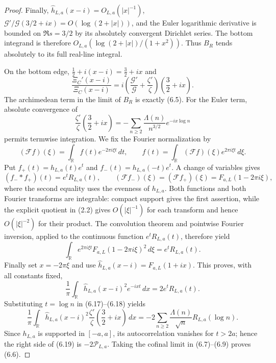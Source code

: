 \documentclass[11pt]{article}
\newcommand{\R}{\mathbb R}
\begin{document}
\begin{proof}
Finally, $\widehat h_{L,a}(x-i)=O_{L,a}(|x|^{-1})$,
$\mathcal G'/\mathcal G(3/2+ix)=O(\log(2+|x|))$, and the Euler logarithmic derivative is bounded
on $\Re s=3/2$ by its absolutely convergent Dirichlet series.  The bottom integrand is therefore
$O_{L,a}(\log(2+|x|)/(1+x^2))$.  Thus $B_R$ tends absolutely to its full real-line integral.

On the bottom edge, $\frac12+i(x-i)=\frac32+ix$ and
\[
 \frac{\Xi_C'(x-i)}{\Xi_C(x-i)}
 =i\left(\frac{\mathcal G'}{\mathcal G}
          +\frac{\zeta'}{\zeta}\right)\!\left(\frac32+ix\right).
 \tag{6.16}
\]
The archimedean term in the limit of $B_R$ is exactly \textup{(6.5)}.  For the Euler term,
absolute convergence of
\[
 \frac{\zeta'}{\zeta}\!\left(\frac32+ix\right)
 =-\sum_{n\ge2}\frac{\Lambda(n)}{n^{3/2}}e^{-ix\log n}
 \tag{6.17}
\]
permits termwise integration.  We fix the Fourier normalization by
\[
 (\mathcal Ff)(\xi)=\int_{\R}f(t)e^{-2\pi i\xi t}\,dt,
 \qquad
 f(t)=\int_{\R}(\mathcal Ff)(\xi)e^{2\pi i\xi t}\,d\xi.
\]
Put $f_+(t)=h_{L,a}(t)e^t$ and $f_-(t)=h_{L,a}(-t)e^t$.  A change of variables gives
\[
 (f_-*f_+)(t)=e^tR_{L,a}(t),
 \qquad
 (\mathcal Ff_-)(\xi)=(\mathcal Ff_+)(\xi)
   =F_{a,L}(1-2\pi i\xi),
\]
where the second equality uses the evenness of $h_{L,a}$.  Both functions and both Fourier
transforms are integrable: compact support gives the first assertion, while the explicit
quotient in \textup{(2.2)} gives $O(|\xi|^{-1})$ for each transform and hence
$O(|\xi|^{-2})$ for their product.  The convolution theorem and pointwise Fourier inversion,
applied to the continuous function $e^tR_{L,a}(t)$, therefore yield
\[
 \int_{\R}e^{2\pi i\xi t}F_{a,L}(1-2\pi i\xi)^2\,d\xi
 =e^tR_{L,a}(t).
\]
Finally set $x=-2\pi\xi$ and use
$\widehat h_{L,a}(x-i)=F_{a,L}(1+ix)$.  This proves, with all constants fixed,
\[
 \frac1\pi\int_{\R}\widehat h_{L,a}(x-i)^2e^{-ixt}\,dx
 =2e^tR_{L,a}(t).
 \tag{6.18}
\]
Substituting $t=\log n$ in \textup{(6.17)}--\textup{(6.18)} yields
\[
 \frac1\pi\int_{\R}\widehat h_{L,a}(x-i)^2
   \frac{\zeta'}{\zeta}\!\left(\frac32+ix\right)\,dx
 =-2\sum_{n\ge2}\frac{\Lambda(n)}{\sqrt n}R_{L,a}(\log n).
 \tag{6.19}
\]
Since $h_{L,a}$ is supported in $[-a,a]$, its autocorrelation vanishes for $t>2a$; hence the
right side of \textup{(6.19)} is $-2\mathcal P_{L,a}$.  Taking the cofinal limit in
\textup{(6.7)}--\textup{(6.9)} proves \textup{(6.6)}.
\end{proof}
\end{document}
